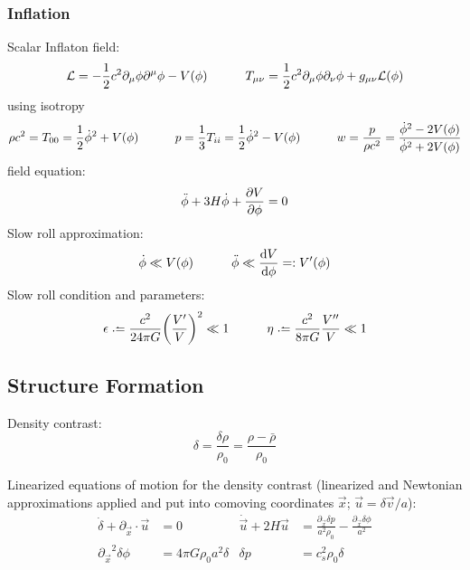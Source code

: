 		\subsubsection{Inflation}
			Scalar Inflaton field:
			\begin{equation}
				\mathcal{L} = -\frac{1}{2}c^2 \partial_\mu \phi \partial^\mu \phi - V(\phi)
				\hspace{30pt}
				T_{\mu\nu} = \frac{1}{2} c^2 \partial_\mu \phi \partial_\nu \phi + g_{\mu\nu} \mathcal{L}(\phi)
			\end{equation}
			using isotropy
			\begin{equation}
				\rho c^2 = T_{00} = \frac{1}{2} \dot{\phi}^2 + V(\phi)
				\hspace{30pt}
				p = \frac{1}{3} T_{ii} = \frac{1}{2} \dot{\phi}^2 - V(\phi)
				\hspace{30pt}
				w = \frac{p}{\rho c^2} = \frac{\dot{\phi}^2 - 2V(\phi)}{\dot{\phi}^2 + 2V(\phi)}
			\end{equation}
			field equation:
			\begin{equation}
				\ddot{\phi} + 3 H \dot{\phi} + \pdv{V}{\phi} = 0
			\end{equation}
			Slow roll approximation:
			\begin{equation}
				\dot{\phi} \ll V(\phi)
				\hspace{30pt}
				\ddot{\phi} \ll \dv{V}{\phi} =: V'(\phi)
			\end{equation}
			Slow roll condition and parameters:
			\begin{equation}
				\epsilon \defeq \frac{c^2}{24\pi G} \qty(\frac{V'}{V})^2 \ll 1
				\hsp
				\eta \defeq \frac{c^2}{8\pi G} \frac{V''}{V} \ll 1
			\end{equation}

	\subsection{Structure Formation}
		Density contrast:
		\begin{equation}
			\delta  = \frac{\delta \rho}{\rho_0} = \frac{ \rho - \bar{\rho}}{\rho_0}
		\end{equation}

		\noindent
		Linearized equations of motion for the density contrast (linearized and Newtonian approximations applied and put into comoving coordinates $\vec{x}$; $\vec{u} = \delta\vec{v}/a$):
		\begin{equation}
			\begin{aligned}
				\dot{\delta} + \partial_{\vec{x}} \cdot \vec{u} &= 0
				&
				\dot{\vec{u}} + 2 H \vec{u} &= \frac{\partial_{\vec{x}} \delta p}{a^2 \rho_0} - \frac{\partial_{\vec{x}} \delta \phi}{a^2} \\
				{\partial_{\vec{x}}}^2 \delta \phi &= 4 \pi G \rho_0 a^2 \delta
				&
				\delta p &= c_s^2 \rho_0 \delta
			\end{aligned}
		\end{equation}

